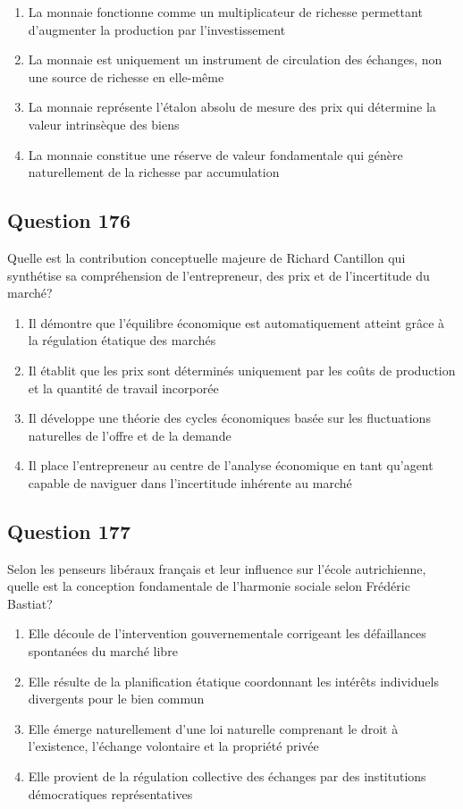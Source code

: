 \documentclass[12pt,a4paper]{article}
\begin{document}
\begin{enumerate}[label=\Alph*., leftmargin=*]
\item La monnaie fonctionne comme un multiplicateur de richesse permettant d'augmenter la production par l'investissement
\item La monnaie est uniquement un instrument de circulation des échanges, non une source de richesse en elle-même
\item La monnaie représente l'étalon absolu de mesure des prix qui détermine la valeur intrinsèque des biens
\item La monnaie constitue une réserve de valeur fondamentale qui génère naturellement de la richesse par accumulation
\end{enumerate}

\bigskip


\subsection*{Question 176}
Quelle est la contribution conceptuelle majeure de Richard Cantillon qui synthétise sa compréhension de l'entrepreneur, des prix et de l'incertitude du marché?

\begin{enumerate}[label=\Alph*., leftmargin=*]
\item Il démontre que l'équilibre économique est automatiquement atteint grâce à la régulation étatique des marchés
\item Il établit que les prix sont déterminés uniquement par les coûts de production et la quantité de travail incorporée
\item Il développe une théorie des cycles économiques basée sur les fluctuations naturelles de l'offre et de la demande
\item Il place l'entrepreneur au centre de l'analyse économique en tant qu'agent capable de naviguer dans l'incertitude inhérente au marché
\end{enumerate}

\bigskip


\subsection*{Question 177}
Selon les penseurs libéraux français et leur influence sur l'école autrichienne, quelle est la conception fondamentale de l'harmonie sociale selon Frédéric Bastiat?

\begin{enumerate}[label=\Alph*., leftmargin=*]
\item Elle découle de l'intervention gouvernementale corrigeant les défaillances spontanées du marché libre
\item Elle résulte de la planification étatique coordonnant les intérêts individuels divergents pour le bien commun
\item Elle émerge naturellement d'une loi naturelle comprenant le droit à l'existence, l'échange volontaire et la propriété privée
\item Elle provient de la régulation collective des échanges par des institutions démocratiques représentatives
\end{enumerate}
\end{document}
